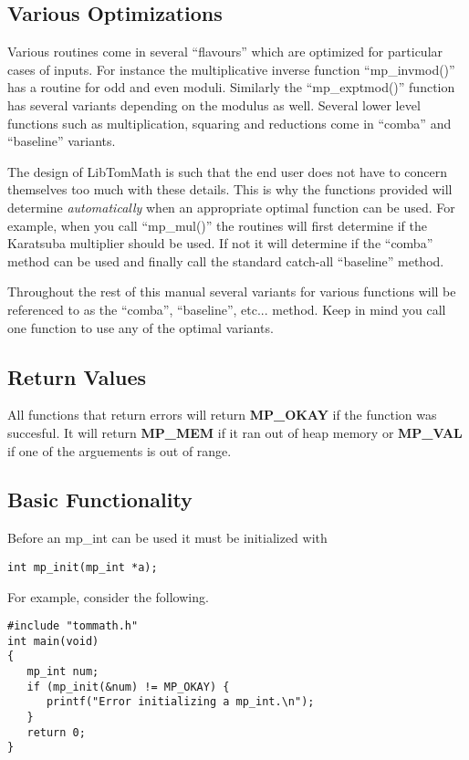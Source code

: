 \documentclass[]{article}
\begin{document}
\subsection{Various Optimizations}
Various routines come in several ``flavours'' which are optimized for particular cases of inputs.  For instance
the multiplicative inverse function ``mp\_invmod()'' has a routine for odd and even moduli.  Similarly the
``mp\_exptmod()'' function has several variants depending on the modulus as well.  Several lower level
functions such as multiplication, squaring and reductions come in ``comba'' and ``baseline'' variants.

The design of LibTomMath is such that the end user does not have to concern themselves too much with these
details.  This is why the functions provided will determine \textit{automatically} when an appropriate
optimal function can be used.  For example, when you call ``mp\_mul()'' the routines will first determine
if the Karatsuba multiplier should be used.  If not it will determine if the ``comba'' method can be used
and finally call the standard catch-all ``baseline'' method.

Throughout the rest of this manual several variants for various functions will be referenced to as
the ``comba'', ``baseline'', etc... method.  Keep in mind you call one function to use any of the optimal
variants.

\subsection{Return Values}
All functions that return errors will return \textbf{MP\_OKAY} if the function was succesful.  It will return 
\textbf{MP\_MEM} if it ran out of heap memory or \textbf{MP\_VAL} if one of the arguements is out of range.  

\subsection{Basic Functionality}
Before an mp\_int can be used it must be initialized with 

\begin{verbatim}
int mp_init(mp_int *a);
\end{verbatim}

For example, consider the following.

\begin{verbatim}
#include "tommath.h"
int main(void)
{
   mp_int num;
   if (mp_init(&num) != MP_OKAY) {
      printf("Error initializing a mp_int.\n");
   }
   return 0;
}   
\end{verbatim}
\end{document}
